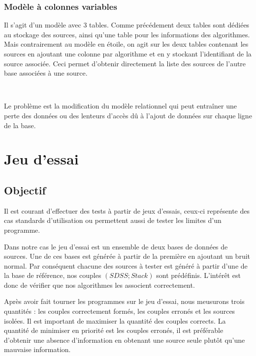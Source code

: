 		\subsubsection{Modèle à colonnes variables}
 
Il s'agit d'un modèle avec 3 tables. Comme précédement deux tables sont dédiées au stockage des sources, ainsi qu'une table pour les informations des algorithmes. Mais contrairement au modèle en étoile, on agit sur les deux tables contenant les sources en ajoutant une colonne par algorithme et en y stockant l'identifiant de la source associée. Ceci permet d'obtenir directement la liste des sources de l'autre base associées à une source.

\ 

Le problème est la modification du modèle relationnel qui peut entraîner une perte des données ou des lenteurs d'accès dû à l'ajout de données sur chaque ligne de la base.


\section{Jeu d'essai}

	\subsection{Objectif}

Il est courant d'effectuer des tests à partir de jeux d'essais, ceux-ci représente des cas standards d'utilisation ou permettent aussi de tester les limites d'un programme.

Dans notre cas le jeu d'essai est un ensemble de deux bases de données de sources. Une de ces bases est générée à partir de la première en ajoutant un bruit normal. Par conséquent chacune des sources à tester est généré à partir d'une de la base de référence, nos couples $(SDSS ; Stack)$ sont prédéfinis. L'intérêt est donc de vérifier que nos algorithmes les associent correctement.

Après avoir fait tourner les programmes sur le jeu d'essai, nous meusurons trois quantités : les couples correctement formés, les couples erronés et les sources isolées. Il est important de maximiser la quantité des couples corrects. La quantité de minimiser en priorité est les couples erronés, il est préférable d'obtenir une absence d'information en obtenant une source seule plutôt qu'une mauvaise information.

